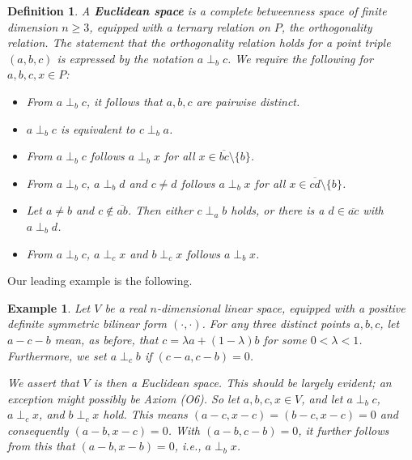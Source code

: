 \documentclass[11pt,a4paper]{article}
\newcommand{\betw}[3]{#1 - #2 - #3}
\newcommand{\ortho}[3]{#1 \perp_{#2} #3}
\newcommand{\lineab}[1]{\overline{#1}}
\newtheorem{definition}[theorem]{Definition}
\newtheorem{example}[theorem]{Example}
\begin{document}
\begin{definition} \label{def:euclidean_space}
A \textbf{Euclidean space} is a complete betweenness space of finite dimension $n \ge 3$, equipped with a ternary relation on $P$, the \textit{orthogonality relation}. The statement that the orthogonality relation holds for a point triple $(a, b, c)$ is expressed by the notation $\ortho{a}{b}{c}$. We require the following for $a, b, c, x \in P$:
\begin{itemize}
    \item[(O1)] From $\ortho{a}{b}{c}$, it follows that $a, b, c$ are pairwise distinct.
    \item[(O2)] $\ortho{a}{b}{c}$ is equivalent to $\ortho{c}{b}{a}$.
    \item[(O3)] From $\ortho{a}{b}{c}$ follows $\ortho{a}{b}{x}$ for all $x \in \lineab{bc} \setminus \{b\}$.
    \item[(O4)] From $\ortho{a}{b}{c}$, $\ortho{a}{b}{d}$ and $c \neq d$ follows $\ortho{a}{b}{x}$ for all $x \in \lineab{cd} \setminus \{b\}$.
    \item[(O5)] Let $a \neq b$ and $c \notin \lineab{ab}$. Then either $\ortho{c}{a}{b}$ holds, or there is a $d \in \lineab{ac}$ with $\ortho{a}{b}{d}$.
    \item[(O6)] From $\ortho{a}{b}{c}$, $\ortho{a}{c}{x}$ and $\ortho{b}{c}{x}$ follows $\ortho{a}{b}{x}$.
\end{itemize}
\end{definition}

Our leading example is the following.

\begin{example} \label{ex:euclidean_model}
Let $V$ be a real $n$-dimensional linear space, equipped with a positive definite symmetric bilinear form $(\cdot, \cdot)$. For any three distinct points $a, b, c$, let $\betw{a}{c}{b}$ mean, as before, that $c = \lambda a + (1 - \lambda)b$ for some $0 < \lambda < 1$. Furthermore, we set $\ortho{a}{c}{b}$ if $(c - a, c - b) = 0$.

We assert that $V$ is then a Euclidean space. This should be largely evident; an exception might possibly be Axiom (O6). So let $a, b, c, x \in V$, and let $\ortho{a}{b}{c}$, $\ortho{a}{c}{x}$, and $\ortho{b}{c}{x}$ hold. This means $(a - c, x - c) = (b - c, x - c) = 0$ and consequently $(a - b, x - c) = 0$. With $(a - b, c - b) = 0$, it further follows from this that $(a - b, x - b) = 0$, i.e., $\ortho{a}{b}{x}$.
\end{example}
\end{document}
